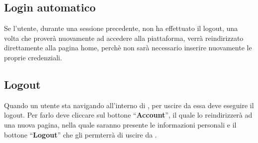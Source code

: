 {    \subsection{Login automatico} {
        Se l'utente, durante una sessione precedente, non ha effettuato il logout, una volta che proverà nuovamente ad accedere alla piattaforma,  
         verrà reindirizzato direttamente alla pagina home, perchè non sarà necessario inserire nuovamente le proprie credenziali.
    
    }
    
    \subsection{Logout} {
        Quando un utente sta navigando all'interno di \platform, per uscire da essa deve eseguire il logout. Per farlo deve cliccare sul bottone ``\textbf{Account}'', il quale lo reindirizzerà ad una nuova pagina,
        nella quale saranno presente le informazioni personali e il bottone ``\textbf{Logout}'' che gli permterrà di uscire da \platform. 
          
    }




}
